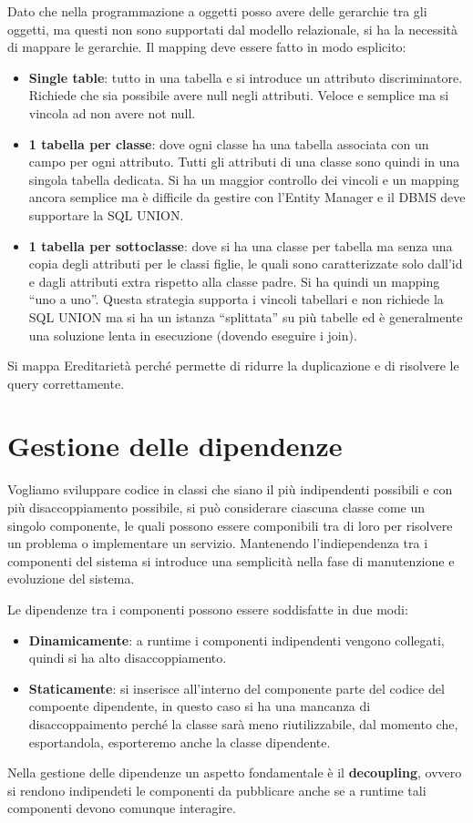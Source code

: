 Dato che nella programmazione a oggetti posso avere delle gerarchie tra gli oggetti,
ma questi non sono supportati dal modello relazionale, si ha la necessità di mappare
le gerarchie. Il mapping deve essere fatto in modo esplicito:
\begin{itemize}
      \item \textbf{Single table}: tutto in una tabella e si introduce un attributo
            discriminatore. Richiede che sia possibile avere null negli attributi.
            Veloce e semplice ma si vincola ad non avere not null.
      \item \textbf{1 tabella per classe}: dove ogni classe ha una tabella
            associata con un campo per ogni attributo. Tutti gli attributi di una
            classe sono quindi in una singola tabella dedicata. Si ha un maggior
            controllo dei vincoli e un mapping ancora semplice ma è difficile
            da gestire con l'Entity Manager e il DBMS deve supportare la SQL
            UNION.
      \item \textbf{1 tabella per sottoclasse}: dove si ha una classe per tabella
            ma senza una copia degli attributi per le classi figlie, le quali sono
            caratterizzate solo dall'id e dagli attributi extra rispetto alla
            classe padre. Si ha quindi un mapping “uno a uno”. Questa strategia
            supporta i vincoli tabellari e non richiede la SQL UNION ma si ha un
            istanza “splittata” su più tabelle ed è generalmente una soluzione
            lenta in esecuzione (dovendo eseguire i join).
\end{itemize}
Si mappa Ereditarietà perché permette di ridurre la duplicazione e di risolvere
le query correttamente.
\section{Gestione delle dipendenze}
Vogliamo sviluppare codice in classi che siano il più indipendenti possibili e con
più disaccoppiamento possibile, si può considerare ciascuna classe come un singolo
componente, le quali possono essere componibili tra di loro per risolvere un problema
o implementare un servizio. Mantenendo l'indiependenza tra i componenti del sistema
si introduce una semplicità nella fase di manutenzione e evoluzione del sistema.

Le dipendenze tra i componenti possono essere soddisfatte in due modi:
\begin{itemize}
      \item \textbf{Dinamicamente}: a runtime i componenti indipendenti vengono
            collegati, quindi si ha alto disaccoppiamento.
      \item \textbf{Staticamente}: si inserisce all'interno del componente parte
            del codice del compoente dipendente, in questo caso si ha una mancanza
            di disaccoppaimento perché la classe sarà meno riutilizzabile, dal
            momento che, esportandola, esporteremo anche la classe dipendente.
\end{itemize}
Nella gestione delle dipendenze un aspetto fondamentale è il \textbf{decoupling},
ovvero si rendono indipendeti le componenti da pubblicare anche se a runtime tali
componenti devono comunque interagire.

